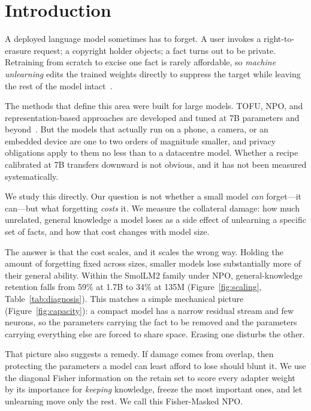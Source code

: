 \documentclass[sigconf,nonacm]{acmart}
\begin{document}

\maketitle

\section{Introduction}
A deployed language model sometimes has to forget. A user invokes a right-to-erasure request; a copyright holder objects; a fact turns out to be private. Retraining from scratch to excise one fact is rarely affordable, so \emph{machine unlearning} edits the trained weights directly to suppress the target while leaving the rest of the model intact~\cite{tofu,npo,yao2023}.

The methods that define this area were built for large models. TOFU, NPO, and representation-based approaches are developed and tuned at 7B parameters and beyond~\cite{tofu,npo,wmdp}. But the models that actually run on a phone, a camera, or an embedded device are one to two orders of magnitude smaller, and privacy obligations apply to them no less than to a datacentre model. Whether a recipe calibrated at 7B transfers downward is not obvious, and it has not been measured systematically.

We study this directly. Our question is not whether a small model \emph{can} forget---it can---but what forgetting \emph{costs} it. We measure the collateral damage: how much unrelated, general knowledge a model loses as a side effect of unlearning a specific set of facts, and how that cost changes with model size.

The answer is that the cost scales, and it scales the wrong way. Holding the amount of forgetting fixed across sizes, smaller models lose substantially more of their general ability. Within the SmolLM2 family under NPO, general-knowledge retention falls from 59\% at 1.7B to 34\% at 135M (Figure~\ref{fig:scaling}, Table~\ref{tab:diagnosis}). This matches a simple mechanical picture (Figure~\ref{fig:capacity}): a compact model has a narrow residual stream and few neurons, so the parameters carrying the fact to be removed and the parameters carrying everything else are forced to share space. Erasing one disturbs the other.

That picture also suggests a remedy. If damage comes from overlap, then protecting the parameters a model can least afford to lose should blunt it. We use the diagonal Fisher information on the retain set to score every adapter weight by its importance for \emph{keeping} knowledge, freeze the most important ones, and let unlearning move only the rest. We call this Fisher-Masked NPO.
\end{document}
